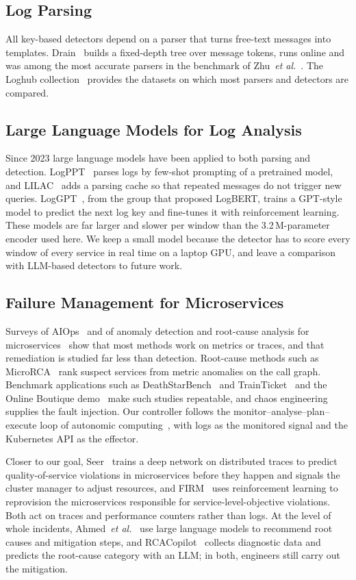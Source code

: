 \documentclass[journal]{IEEEtran}
\begin{document}
\subsection{Log Parsing}
All key-based detectors depend on a parser that turns free-text messages into templates. Drain~\cite{he2017} builds a fixed-depth tree over message tokens, runs online and was among the most accurate parsers in the benchmark of Zhu~\textit{et al.}~\cite{zhu2019}. The Loghub collection~\cite{zhu2023} provides the datasets on which most parsers and detectors are compared.

\subsection{Large Language Models for Log Analysis}
Since 2023 large language models have been applied to both parsing and detection. LogPPT~\cite{le2023} parses logs by few-shot prompting of a pretrained model, and LILAC~\cite{jiang2024} adds a parsing cache so that repeated messages do not trigger new queries. LogGPT~\cite{han2023}, from the group that proposed LogBERT, trains a GPT-style model to predict the next log key and fine-tunes it with reinforcement learning. These models are far larger and slower per window than the 3.2\,M-parameter encoder used here. We keep a small model because the detector has to score every window of every service in real time on a laptop GPU, and leave a comparison with LLM-based detectors to future work.

\subsection{Failure Management for Microservices}
Surveys of AIOps~\cite{notaro2021} and of anomaly detection and root-cause analysis for microservices~\cite{soldani2022} show that most methods work on metrics or traces, and that remediation is studied far less than detection. Root-cause methods such as MicroRCA~\cite{wu2020} rank suspect services from metric anomalies on the call graph. Benchmark applications such as DeathStarBench~\cite{gan2019} and TrainTicket~\cite{zhou2021} and the Online Boutique demo~\cite{onlineboutique} make such studies repeatable, and chaos engineering~\cite{basiri2016} supplies the fault injection. Our controller follows the monitor--analyse--plan--execute loop of autonomic computing~\cite{kephart2003}, with logs as the monitored signal and the Kubernetes API as the effector.

Closer to our goal, Seer~\cite{gan2019seer} trains a deep network on distributed traces to predict quality-of-service violations in microservices before they happen and signals the cluster manager to adjust resources, and FIRM~\cite{qiu2020} uses reinforcement learning to reprovision the microservices responsible for service-level-objective violations. Both act on traces and performance counters rather than logs. At the level of whole incidents, Ahmed~\textit{et al.}~\cite{ahmed2023} use large language models to recommend root causes and mitigation steps, and RCACopilot~\cite{chen2024} collects diagnostic data and predicts the root-cause category with an LLM; in both, engineers still carry out the mitigation.
\end{document}
